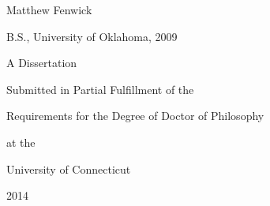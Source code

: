 \begin{titlepage}
  \begin{center}

  {\huge \mattftitle{}}

    \large

    \vspace{1cm}

    Matthew Fenwick

    \vspace{1in}

    B.S., University of Oklahoma, 2009

    \vfill

    A Dissertation 

    Submitted in Partial Fulfillment of the 

    Requirements for the Degree of Doctor of Philosophy 

    at the 

    University of Connecticut 

    \vspace{1cm}

    2014
  \end{center}
\end{titlepage}

